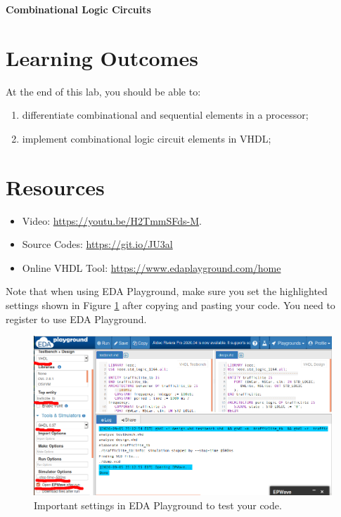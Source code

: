\documentclass[a4paper, 11pt,oneside]{article}
\begin{document}
\begin{center}
	{\LARGE \textbf{Combinational Logic Circuits}}
\end{center}

\section*{Learning Outcomes}
   At the end of this lab, you should be able to:
   \begin{enumerate}[itemsep=0pt,parsep=0pt]
   	   \item differentiate combinational and sequential elements in a processor;
       \item implement combinational logic circuit elements in VHDL;

   \end{enumerate}   

\tableofcontents

\section{Resources}
\begin{itemize}
	\item Video: \href{https://youtu.be/H2TmmSFds-M}{https://youtu.be/H2TmmSFds-M}.
	\item Source Codes: \href{https://git.io/JU3al}{https://git.io/JU3al}
	\item Online VHDL Tool: \href{https://www.edaplayground.com/home}
		{https://www.edaplayground.com/home}
\end{itemize}	

Note that when using EDA Playground, make sure you set the highlighted settings 
shown in Figure \ref{fig:playground} after copying and pasting your code.
You need to register to use EDA Playground.

\begin{figure}[H]
	\begin{center}
	\includegraphics[width=5in]{playground.png}
	\caption{Important settings in EDA Playground to test your code.}
	\label{fig:playground} 
	\end{center}
\end{figure}
\end{document}
